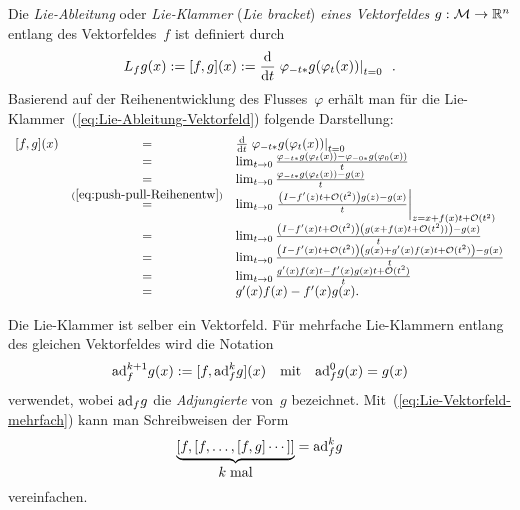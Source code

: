 Die \emph{Lie-Ableitung} oder \emph{Lie-Klammer }(\emph{Lie bracket})\emph{
eines Vektorfeldes}
$g:\mathcal{M}\to{\mathbb{R}}^{n}$ entlang des Vektorfeldes~$f$ ist definiert
durch 
\begin{equation}
L_{f}g(x):=[f,g](x):=\frac{{\mathrm{d}}}{{\mathrm{d}} t}\left.\varphi_{-t*}g(\varphi_{t}(x))\right|_{t=0}\enspace.\label{eq:Lie-Ableitung-Vektorfeld}
\end{equation}
Basierend auf der Reihenentwicklung des Flusses~$\varphi$ erhält
man für die Lie-Klammer~(\ref{eq:Lie-Ableitung-Vektorfeld}) folgende
Darstellung: 
\begin{equation}
\begin{array}{ccl}
[f,g](x) & = & \frac{{\mathrm{d}}}{{\mathrm{d}} t}\left.\varphi_{-t*}g(\varphi_{t}(x))\right|_{t=0}\\
 & = & \lim_{t\to0}\frac{\varphi_{-t*}g(\varphi_{t}(x))-\varphi_{-0*}g(\varphi_{0}(x))}{t}\\
 & = & \lim_{t\to0}\frac{\varphi_{-t*}g(\varphi_{t}(x))-g(x)}{t}\\
 & \stackrel{(\ref{eq:push-pull-Reihenentw})}{=} & \lim_{t\to0}\left.\frac{\left(I-f^{\prime}(z)t+\mathcal{O}(t^{2})\right)g(z)-g(x)}{t}\right|_{z=x+f(x)t+\mathcal{O}(t^{2})}\\
 & = & \lim_{t\to0}\frac{\left(I-f^{\prime}(x)t+\mathcal{O}(t^{2})\right)\left(g(x+f(x)t+\mathcal{O}(t^{2}))\right)-g(x)}{t}\\
 & = & \lim_{t\to0}\frac{\left(I-f^{\prime}(x)t+\mathcal{O}(t^{2})\right)\left(g(x)+g^{\prime}(x)f(x)t+\mathcal{O}(t^{2})\right)-g(x)}{t}\\
 & = & \lim_{t\to0}\frac{g^{\prime}(x)f(x)t-f^{\prime}(x)g(x)t+\mathcal{O}(t^{2})}{t}\\
 & = & g^{\prime}(x)f(x)-f^{\prime}(x)g(x).
\end{array}\label{eq:Lie-Vektorfeld-Berechnung}
\end{equation}

Die Lie-Klammer ist selber ein Vektorfeld. Für mehrfache Lie-Klammern
entlang des gleichen Vektorfeldes wird die Notation 
\begin{equation}
{\operatorname{ad}}_{f}^{k+1}g(x):=[f,{\operatorname{ad}}_{f}^{k}g](x)\quad\mbox{mit}\quad{\operatorname{ad}}_{f}^{0}g(x)=g(x)\label{eq:Lie-Vektorfeld-mehrfach}
\end{equation}
verwendet, wobei ${\operatorname{ad}}_{f}g$ die \emph{Adjungierte}
von~$g$ bezeichnet. Mit~(\ref{eq:Lie-Vektorfeld-mehrfach}) kann
man Schreibweisen der Form
\[
\underbrace{[f,[f,\ldots,[f,g]\cdots]]}_{{\displaystyle k\;\mbox{mal}}}={\operatorname{ad}}_{f}^{k}g
\]
vereinfachen.

